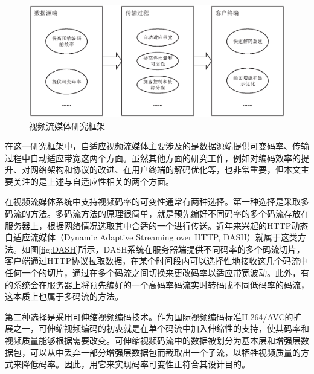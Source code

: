 \begin{figure}[t]
	\centering
	\vspace{10pt}
	\includegraphics[width = 1.0\linewidth]{eps/research-framework}
	\caption{视频流媒体研究框架 \label{fig:research-framework}}
\end{figure}

\vspace{10pt}
在这一研究框架中，自适应视频流媒体主要涉及的是数据源端提供可变码率、传输过程中自动适应带宽这两个方面。虽然其他方面的研究工作，例如对编码效率的提升、对网络架构和协议的改进、在用户终端的解码优化等，也非常重要，但本文主要关注的是上述与自适应性相关的两个方面。

在视频流媒体系统中支持视频码率的可变性通常有两种选择。第一种选择是采取多码流的方法。多码流方法的原理很简单，就是预先编好不同码率的多个码流存放在服务器上，根据网络情况选取其中合适的一个进行传送。近年来兴起的HTTP动态自适应流媒体（Dynamic Adaptive Streaming over HTTP,  DASH）\supercite{Sodagar2011}就属于这类方法。如图\ref{fig:DASH}所示，DASH系统在服务器端提供不同码率的多个码流切片，客户端通过HTTP协议拉取数据，在某个时间段内可以选择性地接收这几个码流中任何一个的切片，通过在多个码流之间切换来更改码率以适应带宽波动。此外，有的系统会在服务器上将预先编好的一个高码率码流实时转码成不同低码率的码流，这本质上也属于多码流的方法。

第二种选择是采用可伸缩视频编码\supercite{SVC-Overview}技术。作为国际视频编码标准H.264/AVC\supercite{H.264}的扩展之一，可伸缩视频编码的初衷就是在单个码流中加入伸缩性的支持，使其码率和视频质量能够根据需要改变。可伸缩视频码流中的数据被划分为基本层和增强层数据包，可以从中丢弃一部分增强层数据包而截取出一个子流，以牺牲视频质量的方式来降低码率。因此，用它来实现码率可变性正符合其设计目的。

